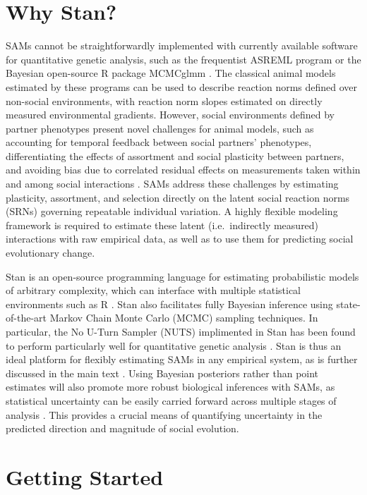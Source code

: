 \documentclass[
]{book}
\begin{document}
\hypertarget{why-stan}{%
\section{Why Stan?}\label{why-stan}}

SAMs cannot be straightforwardly implemented with currently available software for quantitative genetic analysis, such as the frequentist ASREML program \citep{ASREML} or the Bayesian open-source R package MCMCglmm \citep{MCMCglmm}. The classical animal models estimated by these programs can be used to describe reaction norms defined over non-social environments, with reaction norm slopes estimated on directly measured environmental gradients. However, social environments defined by partner phenotypes present novel challenges for animal models, such as accounting for temporal feedback between social partners' phenotypes, differentiating the effects of assortment and social plasticity between partners, and avoiding bias due to correlated residual effects on measurements taken within and among social interactions \citep{SAM}. SAMs address these challenges by estimating plasticity, assortment, and selection directly on the latent social reaction norms (SRNs) governing repeatable individual variation. A highly flexible modeling framework is required to estimate these latent (i.e.~indirectly measured) interactions with raw empirical data, as well as to use them for predicting social evolutionary change.

Stan \citep{Stan} is an open-source programming language for estimating probabilistic models of arbitrary complexity, which can interface with multiple statistical environments such as R \citep{Rbase}. Stan also facilitates fully Bayesian inference using state-of-the-art Markov Chain Monte Carlo (MCMC) sampling techniques. In particular, the No U-Turn Sampler (NUTS) implimented in Stan has been found to perform particularly well for quantitative genetic analysis \citep{MCMCperf}. Stan is thus an ideal platform for flexibly estimating SAMs in any empirical system, as is further discussed in the main text \citep{SAM}. Using Bayesian posteriors rather than point estimates will also promote more robust biological inferences with SAMs, as statistical uncertainty can be easily carried forward across multiple stages of analysis \citep{Stinchcombe2014}. This provides a crucial means of quantifying uncertainty in the predicted direction and magnitude of social evolution.

\hypertarget{getting-started}{%
\section{Getting Started}\label{getting-started}}
\end{document}
